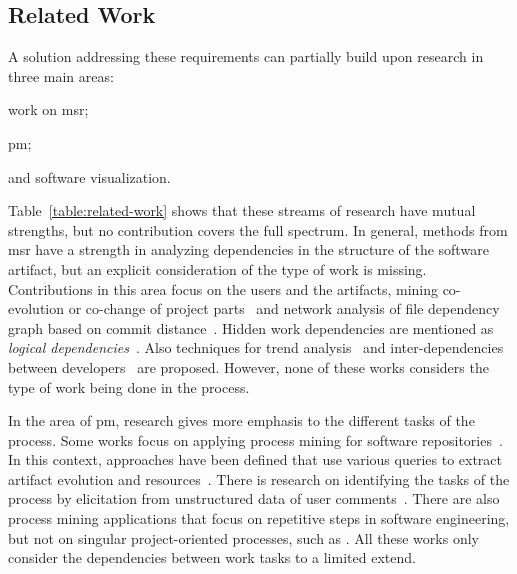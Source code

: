 \subsection{Related Work}
\label{subsec:related}
A solution addressing these requirements can partially build upon research in three main areas:
\begin{inparaenum}[\itshape i)]
	\item work on \gls{msr};
	\item \gls{pm};
	\item and software visualization.
\end{inparaenum}



Table~\ref{table:related-work} shows that these streams of research have mutual strengths, but no contribution covers the full spectrum. In general, methods from \gls{msr} have a strength in analyzing dependencies in the structure of the software artifact, but an explicit consideration of the type of work is missing. Contributions in this area focus on the users and the artifacts, mining co-evolution or co-change of project parts~\cite{zaidman2008mining,DAmbros2009} and network analysis of file dependency graph based on commit distance~\cite{Zimmermann2008,Abate2009,Weicheng2013}. Hidden work dependencies are mentioned as \emph{logical dependencies}~\cite{Oliva2011}. Also techniques for trend analysis~\cite{Ruohonen2015} and inter-dependencies between developers~\cite{lindberg2016coordinating} are proposed. However, none of these works considers the type of work being done in the process.

In the area of \gls{pm}, research gives more emphasis to the different tasks of the process. Some works focus on applying process mining for software repositories~\cite{Poncin2011a,Mittal2014,Bala2015}. In this context, approaches have been defined that use various queries to extract artifact evolution and resources~\cite{Beheshti2016,Beheshti2013}. There is research on identifying the tasks of the process by elicitation from unstructured data of user comments~\cite{Goncalves2011}. There are also process mining applications that focus on repetitive steps in software engineering, but not on singular project-oriented processes, such as \cite{Kindler2006}. All these works only consider the dependencies between work tasks to a limited extend.


